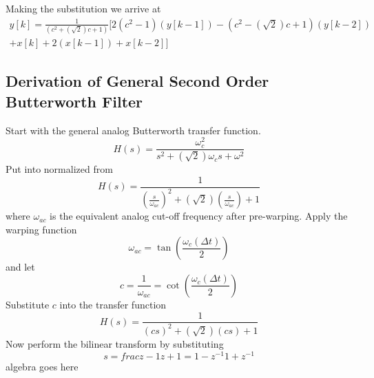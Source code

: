 \documentclass[12pt, letterpaper, twoside]{article}
\begin{document}
Making the substitution we arrive at
\begin{multline*}
y[k] = \frac{1}{(c^2+(\sqrt{2})c+1)} \biggl[ 2(c^2-1)(y[k-1]) -(c^2-(\sqrt{2})c+1)(y[k-2])  \\
+ x[k] + 2(x[k-1]) + x[k-2]\biggr]
\end{multline*}

\subsection{Derivation of General Second Order Butterworth Filter}
Start with the general analog Butterworth transfer function.
\[
H(s) = \frac{\omega_c^2}{s^2 + (\sqrt{2})\omega_c s + \omega^2}
\]
Put into normalized from
\[
H(s) = \frac{1}{\left(\frac{s}{\omega_{ac}}\right)^2 + (\sqrt{2})\left(\frac{s}{\omega_{ac}}\right) + 1}
\]
where $\omega_{ac}$ is the equivalent analog cut-off frequency after pre-warping.
Apply the warping function
\[
\omega_{ac} = \tan{\left(\frac{\omega_c (\Delta t)}{2}\right)}
\]
and let
\[
c = \frac{1}{\omega_{ac}}=\cot{\left(\frac{\omega_c (\Delta t)}{2}\right)}
\]
Substitute $c$ into the transfer function
\[
H(s) = \frac{1}{(cs)^2 + (\sqrt{2})(cs) + 1}
\]
Now perform the bilinear transform by substituting
\[
s = frac{z-1}{z+1}={1-z^{-1}}{1+z^{-1}}
\]
algebra goes here
\end{document}
